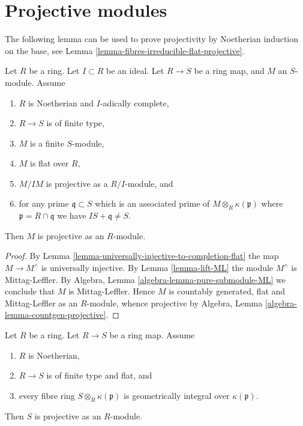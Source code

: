 \section{Projective modules}
\label{section-projective}

\noindent
The following lemma can be used to prove projectivity by
Noetherian induction on the base, see
Lemma \ref{lemma-fibres-irreducible-flat-projective}.

\begin{lemma}
\label{lemma-flat-pure-over-complete-projective}
Let $R$ be a ring.
Let $I \subset R$ be an ideal.
Let $R \to S$ be a ring map, and $M$ an $S$-module.
Assume
\begin{enumerate}
\item $R$ is Noetherian and $I$-adically complete,
\item $R \to S$ is of finite type,
\item $M$ is a finite $S$-module,
\item $M$ is flat over $R$,
\item $M/IM$ is projective as a $R/I$-module, and
\item for any prime $\mathfrak q \subset S$ which is an associated prime of
$M \otimes_R \kappa(\mathfrak p)$ where $\mathfrak p = R \cap \mathfrak q$
we have $IS + \mathfrak q \not = S$.
\end{enumerate}
Then $M$ is projective as an $R$-module.
\end{lemma}

\begin{proof}
By
Lemma \ref{lemma-universally-injective-to-completion-flat}
the map $M \to M^\wedge$ is universally injective.
By
Lemma \ref{lemma-lift-ML}
the module $M^\wedge$ is Mittag-Leffler.
By
Algebra, Lemma \ref{algebra-lemma-pure-submodule-ML}
we conclude that $M$ is Mittag-Leffler.
Hence $M$ is countably generated, flat and Mittag-Leffler as an $R$-module,
whence projective by
Algebra, Lemma \ref{algebra-lemma-countgen-projective}.
\end{proof}

\begin{lemma}
\label{lemma-fibres-irreducible-flat-projective}
Let $R$ be a ring.
Let $R \to S$ be a ring map.
Assume
\begin{enumerate}
\item $R$ is Noetherian,
\item $R \to S$ is of finite type and flat, and
\item every fibre ring $S \otimes_R \kappa(\mathfrak p)$ is
geometrically integral over $\kappa(\mathfrak p)$.
\end{enumerate}
Then $S$ is projective as an $R$-module.
\end{lemma}

